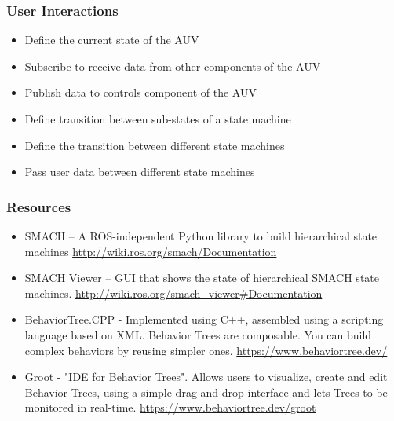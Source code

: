 \subsubsection{User Interactions}
\label{sec:interactions}
\begin{itemize}
    \item Define the current state of the AUV 
    \item Subscribe to receive data from other components of the AUV 
    \item Publish data to controls component of the AUV 
    \item Define transition between sub-states of a state machine 
    \item Define the transition between different state machines 
    \item Pass user data between different state machines
\end{itemize}

\subsubsection{Resources}
\label{sec:resources}

\begin{itemize}
    \item SMACH – A ROS-independent Python library to build hierarchical state
        machines \url{http://wiki.ros.org/smach/Documentation}
    \item SMACH Viewer – GUI that shows the state of hierarchical SMACH state
        machines. \url{http://wiki.ros.org/smach_viewer#Documentation}
    \item BehaviorTree.CPP - Implemented using C++, assembled using a scripting
        language based on XML. Behavior Trees are composable. You can build
        complex behaviors by reusing simpler ones.
        \url{https://www.behaviortree.dev/}
    \item Groot - "IDE for Behavior Trees". Allows users to visualize, create
        and edit Behavior Trees, using a simple drag and drop interface and
        lets Trees to be monitored in real-time.
        \url{https://www.behaviortree.dev/groot}
\end{itemize}

